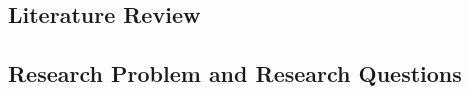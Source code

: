 



\subsection{}

\subsection{Literature Review}



\lipsum[1]

\subsection{Research Problem and Research Questions}

\lipsum[1]



